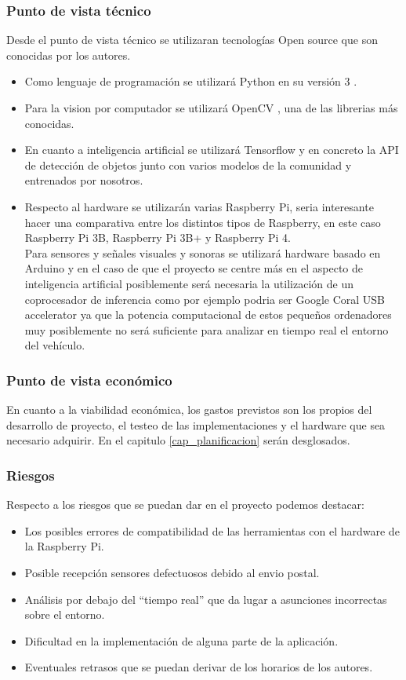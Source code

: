 \subsubsection{Punto de vista técnico}
Desde el punto de vista técnico se utilizaran tecnologías Open source que son conocidas por los autores.
\begin{itemize}
    \item Como lenguaje de programación se utilizará Python en su versión 3 \cite{python}.
    \item Para la vision por computador se utilizará OpenCV \cite{opencv}, una de las librerias más conocidas.
    \item En cuanto a inteligencia artificial se utilizará Tensorflow \cite{tensorflow} y en concreto la API de detección de objetos junto con varios modelos de la comunidad y entrenados por nosotros.
    \item Respecto al hardware se utilizarán varias Raspberry Pi, seria interesante hacer una comparativa entre los distintos tipos de Raspberry, en este caso Raspberry Pi 3B, Raspberry Pi 3B+ y Raspberry Pi 4.\\
    Para sensores y señales visuales y sonoras se utilizará hardware basado en Arduino y en el caso de que el proyecto se centre más en el aspecto de inteligencia artificial posiblemente será necesaria la utilización de un coprocesador de inferencia como por ejemplo podria ser Google Coral USB accelerator \cite{coralUSB} ya que la potencia computacional de estos pequeños ordenadores muy posiblemente no será suficiente para analizar en tiempo real el entorno del vehículo.
\end{itemize}

\subsubsection{Punto de vista económico}
En cuanto a la viabilidad económica, los gastos previstos son los propios del desarrollo de proyecto, el testeo de las implementaciones y el hardware que sea necesario adquirir. En el capitulo \ref{cap_planificacion} serán desglosados.

\subsubsection{Riesgos}\label{sec_riesgosiniciacion}
Respecto a los riesgos que se puedan dar en el proyecto podemos destacar:
\begin{itemize}
    \item Los posibles errores de compatibilidad de las herramientas con el hardware de la Raspberry Pi.
    \item Posible recepción sensores defectuosos debido al envio postal.
    \item Análisis por debajo del ``tiempo real'' que da lugar a asunciones incorrectas sobre el entorno.
    \item Dificultad en la implementación de alguna parte de la aplicación.
    \item Eventuales retrasos que se puedan derivar de los horarios de los autores.
\end{itemize}



